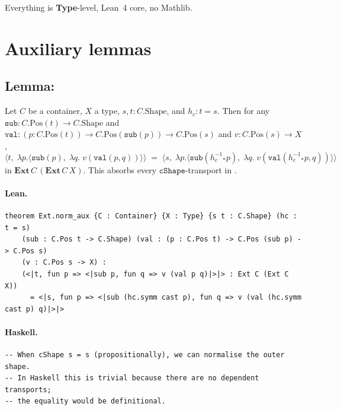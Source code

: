 \documentclass[11pt,a4paper]{article}
\begin{document}
Everything is \textbf{Type}-level, Lean~4 core, no Mathlib.

\section{Auxiliary lemmas}

\subsection{Lemma: }

\begin{prop}
Let $C$ be a container, $X$ a type, $s, t : C.\mathrm{Shape}$, and $h_c : t = s$.
Then for any $\mathtt{sub} : C.\mathrm{Pos}(t) \to C.\mathrm{Shape}$ and
$\mathtt{val} : (p : C.\mathrm{Pos}(t)) \to C.\mathrm{Pos}(\mathtt{sub}(p)) \to C.\mathrm{Pos}(s)$
and $v : C.\mathrm{Pos}(s) \to X$,
\[
  \bigl\langle t,\; \lambda p.\langle \mathtt{sub}(p),\;
    \lambda q.\; v(\mathtt{val}(p, q))\rangle \bigr\rangle
  \;=\;
  \bigl\langle s,\; \lambda p.\langle \mathtt{sub}(h_c^{-1}{}_* p),\;
    \lambda q.\; v(\mathtt{val}(h_c^{-1}{}_* p, q))\rangle \bigr\rangle
\]
in $\mathbf{Ext}\,C\,(\mathbf{Ext}\,C\,X)$.  This absorbs every
$\mathtt{cShape}$-transport in .
\end{prop}

\paragraph{Lean.}
\begin{lstlisting}[style=lean]
theorem Ext.norm_aux {C : Container} {X : Type} {s t : C.Shape} (hc : t = s)
    (sub : C.Pos t -> C.Shape) (val : (p : C.Pos t) -> C.Pos (sub p) -> C.Pos s)
    (v : C.Pos s -> X) :
    (<|t, fun p => <|sub p, fun q => v (val p q)|>|> : Ext C (Ext C X))
      = <|s, fun p => <|sub (hc.symm cast p), fun q => v (val (hc.symm cast p) q)|>|>
\end{lstlisting}

\paragraph{Haskell.}
\begin{lstlisting}[style=haskell]
-- When cShape s = s (propositionally), we can normalise the outer shape.
-- In Haskell this is trivial because there are no dependent transports;
-- the equality would be definitional.
\end{lstlisting}
\end{document}
